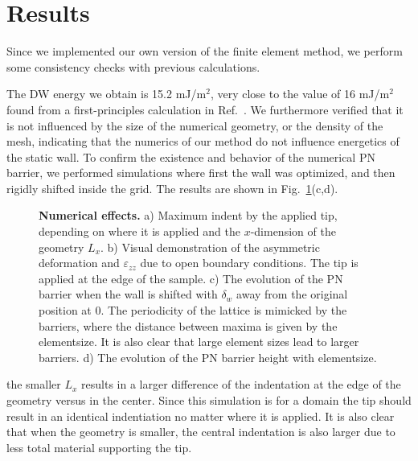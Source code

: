 \section{Results}
Since we implemented our own version of the finite element method, we perform some consistency checks with previous calculations.

The DW energy we obtain is 15.2 mJ/m$^2$, very close to the value of 16 mJ/m$^2$ found from a first-principles calculation in Ref.~\cite{Padilla1996}.
We furthermore verified that it is not influenced by the size of the numerical geometry, or the density of the mesh, indicating that the numerics of our method do not influence energetics of the static wall.
To confirm the existence and behavior of the numerical PN barrier, we performed simulations where first the wall was optimized, and then rigidly shifted inside the grid.
The results are shown in Fig.~\ref{fig:BTO_numerical_effects}(c,d).
\begin{figure}[h!]
	\caption{\label{fig:BTO_numerical_effects}{\bf Numerical effects.} a) Maximum indent by the applied tip, depending on where it is applied and the $x$-dimension of the geometry $L_x$. b) Visual demonstration of the asymmetric deformation and $\varepsilon_{zz}$ due to open boundary conditions. The tip is applied at the edge of the sample. c) The evolution of the PN barrier when the wall is shifted with $\delta_w$ away from the original position at 0. The periodicity of the lattice is mimicked by the barriers, where the distance between maxima is given by the elementsize. It is also clear that large element sizes lead to larger barriers. d) The evolution of the PN barrier height with elementsize.}
\end{figure}
the smaller $L_x$ results in a larger difference of the indentation at the edge of the  geometry versus in the center. Since this simulation is for a domain the tip should result in an identical indentiation no matter where it is applied. It is also clear that when the geometry is smaller, the central indentation is also larger due to less total material supporting the tip. 


